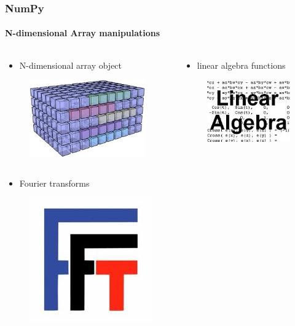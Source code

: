 \documentclass[compress=true]{beamer}
\begin{document}
\begin{frame}
	\frametitle{NumPy}
	\framesubtitle{N-dimensional Array manipulations}
	\begin{columns}
		\begin{column}{0.5\textwidth}
			\begin{itemize}
				\item N-dimensional array object
			\end{itemize}
			\begin{figure}
				\includegraphics[height=0.2\textheight]{ndarray.png}
			\end{figure}
		\end{column}
		\begin{column}{0.5\textwidth}
			\begin{itemize}
				\item linear algebra functions
			\end{itemize}
			\begin{figure}
				\includegraphics[height=0.2\textheight]{linear_algebra_1.png}
			\end{figure}
		\end{column}
	\end{columns}
	\begin{columns}
		\begin{column}{0.5\textwidth}
			\begin{itemize}
				\item Fourier transforms
			\end{itemize}
			\begin{figure}
				\includegraphics[height=0.3\textheight]{fft.png}

\end{figure}
\end{column}
\end{columns}
\end{frame}
\end{document}
